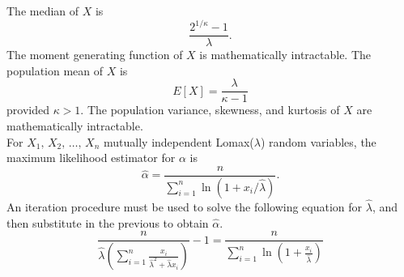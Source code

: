 \documentclass[12pt,fullpage]{article}
\begin{document}
The median of $X$ is
$$
\frac{2^{1/\kappa} - 1}{\lambda}.
$$
The moment generating function of $X$ is mathematically intractable.
The population mean of $X$ is 
$$
E[X]=\frac{\lambda}{\kappa - 1}$$ provided $\kappa > 1$. The population variance, skewness, and kurtosis of $X$ are mathematically intractable.\\
For $X_1, \, X_2, \, \ldots , \, X_n$ mutually independent Lomax($\lambda$) random variables,
the maximum likelihood estimator for $\alpha$ is
$$
\hat \alpha = \frac{n}{\sum_{i=1} ^ n \ln\left(1 +  x_i  /  \hat\lambda \right)}.
$$
An iteration procedure must be used to solve the following equation for $\hat\lambda$, and then substitute in the previous to obtain $\hat\alpha$.
$$
\frac{n}{\hat\lambda\left(\sum_{i=1} ^ n \frac{x_i}{\hat\lambda^2 + \hat\lambda x_i}\right)} - 1 = \frac{n}{\sum_{i=1} ^ n \ln\left(1 + \frac{x_i}{\hat\lambda}\right)}
$$ 


\vspace{0.1in}

\noindent
\end{document}

